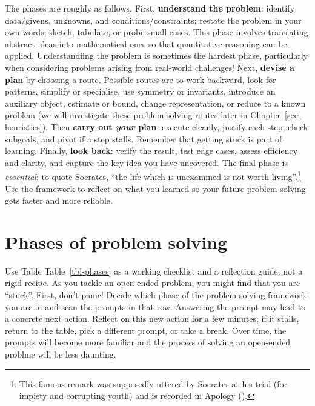 \documentclass[
  a4paper,
  DIV=11,
  numbers=noendperiod,
  oneside]{scrreprt}
\begin{document}
The phases are roughly as follows. First, \textbf{understand the
problem}: identify data/givens, unknowns, and conditions/constraints;
restate the problem in your own words; sketch, tabulate, or probe small
cases. This phase involves translating abstract ideas into mathematical
ones so that quantitative reasoning can be applied. Understandiing the
problem is sometimes the hardest phase, particularly when considering
problems arising from real-world challenges! Next, \textbf{devise a
plan} by choosing a route. Possible routes are to work backward, look
for patterns, simplify or specialise, use symmetry or invariants,
introduce an auxiliary object, estimate or bound, change representation,
or reduce to a known problem (we will investigate these problem solving
routes later in Chapter~\ref{sec-heuristics}). Then \textbf{carry out
\emph{your} plan}: execute cleanly, justify each step, check subgoals,
and pivot if a step stalls. Remember that getting stuck is part of
learning. Finally, \textbf{look back}: verify the result, test edge
cases, assess efficiency and clarity, and capture the key idea you have
uncovered. The final phase is \emph{essential}; to quote Socrates, ``the
life which is unexamined is not worth living''.\footnote{This famous
  remark was supposedly uttered by Socrates at his trial (for impiety
  and corrupting youth) and is recorded in Apology
  ().}
Use the framework to reflect on what you learned so your future problem
solving gets faster and more reliable.

\section{Phases of problem solving}\label{sec-phases}

Use Table Table~\ref{tbl-phases} as a working checklist and a reflection
guide, not a rigid recipe. As you tackle an open-ended problem, you
might find that you are ``stuck''. First, don't panic! Decide which
phase of the problem solving framework you are in and scan the prompts
in that row. Answering the prompt may lead to a concrete next action.
Reflect on this new action for a few minutes; if it stalls, return to
the table, pick a different prompt, or take a break. Over time, the
prompts will become more familiar and the process of solving an
open-ended problme will be less daunting.
\end{document}
